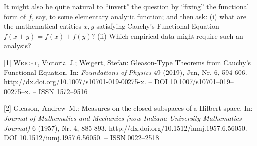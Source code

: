 \documentclass[english]{article}
\begin{document}
It might also be quite natural to ``invert'' the question by ``fixing'' the functional form of $f$, say, to some elementary analytic function; and then ask: (i) what are the mathematical entities $x,y$ satisfying Cauchy's Functional Equation $f(x+y) = f(x)+f(y)$? (ii) Which empirical data might require such an analysis?

\bigskip{}


[1] \textsc{Wright}, Victoria~J.;
   {Weigert}, Stefan:
 {G}leason-Type Theorems from {C}auchy's {F}unctional {E}quation.
 {In: }\emph{Foundations of Physics} 49 (2019), Jun, Nr. 6, 594-606.
  {http://dx.doi.org/10.1007/s10701-019-00275-x}. --
 DOI 10.1007/s10701--019--00275--x. --
 ISSN 1572--9516

[2]  {Gleason}, Andrew~M.:
 Measures on the closed subspaces of a {H}ilbert space.
 {In: }\emph{Journal of Mathematics and Mechanics (now Indiana
  University Mathematics Journal)} 6 (1957), Nr. 4, 885-893.
  {http://dx.doi.org/10.1512/iumj.1957.6.56050}. --
 DOI 10.1512/iumj.1957.6.56050. --
 ISSN 0022--2518

%
%
\end{document}
